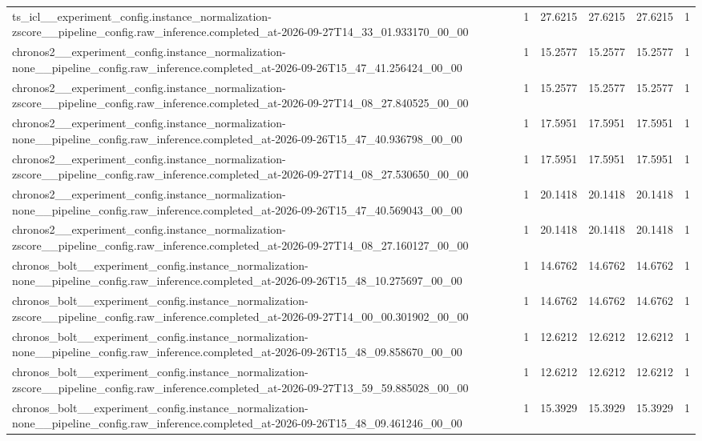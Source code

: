 \begin{tabular}{llllll}
ts\_icl\_\_experiment\_config.instance\_normalization-zscore\_\_pipeline\_config.raw\_inference.completed\_at-2026-09-27T14\_33\_01.933170\_00\_00 & 1 & 27.6215 & 27.6215 & 27.6215 & 1 \\
chronos2\_\_experiment\_config.instance\_normalization-none\_\_pipeline\_config.raw\_inference.completed\_at-2026-09-26T15\_47\_41.256424\_00\_00 & 1 & 15.2577 & 15.2577 & 15.2577 & 1 \\
chronos2\_\_experiment\_config.instance\_normalization-zscore\_\_pipeline\_config.raw\_inference.completed\_at-2026-09-27T14\_08\_27.840525\_00\_00 & 1 & 15.2577 & 15.2577 & 15.2577 & 1 \\
chronos2\_\_experiment\_config.instance\_normalization-none\_\_pipeline\_config.raw\_inference.completed\_at-2026-09-26T15\_47\_40.936798\_00\_00 & 1 & 17.5951 & 17.5951 & 17.5951 & 1 \\
chronos2\_\_experiment\_config.instance\_normalization-zscore\_\_pipeline\_config.raw\_inference.completed\_at-2026-09-27T14\_08\_27.530650\_00\_00 & 1 & 17.5951 & 17.5951 & 17.5951 & 1 \\
chronos2\_\_experiment\_config.instance\_normalization-none\_\_pipeline\_config.raw\_inference.completed\_at-2026-09-26T15\_47\_40.569043\_00\_00 & 1 & 20.1418 & 20.1418 & 20.1418 & 1 \\
chronos2\_\_experiment\_config.instance\_normalization-zscore\_\_pipeline\_config.raw\_inference.completed\_at-2026-09-27T14\_08\_27.160127\_00\_00 & 1 & 20.1418 & 20.1418 & 20.1418 & 1 \\
chronos\_bolt\_\_experiment\_config.instance\_normalization-none\_\_pipeline\_config.raw\_inference.completed\_at-2026-09-26T15\_48\_10.275697\_00\_00 & 1 & 14.6762 & 14.6762 & 14.6762 & 1 \\
chronos\_bolt\_\_experiment\_config.instance\_normalization-zscore\_\_pipeline\_config.raw\_inference.completed\_at-2026-09-27T14\_00\_00.301902\_00\_00 & 1 & 14.6762 & 14.6762 & 14.6762 & 1 \\
chronos\_bolt\_\_experiment\_config.instance\_normalization-none\_\_pipeline\_config.raw\_inference.completed\_at-2026-09-26T15\_48\_09.858670\_00\_00 & 1 & 12.6212 & 12.6212 & 12.6212 & 1 \\
chronos\_bolt\_\_experiment\_config.instance\_normalization-zscore\_\_pipeline\_config.raw\_inference.completed\_at-2026-09-27T13\_59\_59.885028\_00\_00 & 1 & 12.6212 & 12.6212 & 12.6212 & 1 \\
chronos\_bolt\_\_experiment\_config.instance\_normalization-none\_\_pipeline\_config.raw\_inference.completed\_at-2026-09-26T15\_48\_09.461246\_00\_00 & 1 & 15.3929 & 15.3929 & 15.3929 & 1 \\

\end{tabular}
